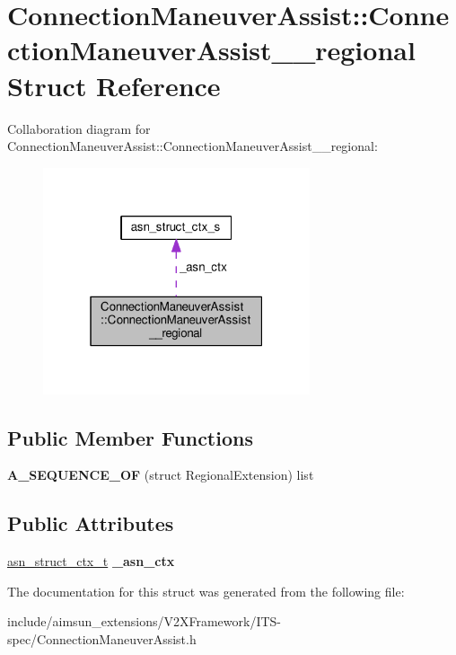 \hypertarget{structConnectionManeuverAssist_1_1ConnectionManeuverAssist____regional}{}\section{Connection\+Maneuver\+Assist\+:\+:Connection\+Maneuver\+Assist\+\_\+\+\_\+regional Struct Reference}
\label{structConnectionManeuverAssist_1_1ConnectionManeuverAssist____regional}


Collaboration diagram for Connection\+Maneuver\+Assist\+:\+:Connection\+Maneuver\+Assist\+\_\+\+\_\+regional\+:\nopagebreak
\begin{figure}[H]
\begin{center}
\leavevmode
\includegraphics[width=223pt]{structConnectionManeuverAssist_1_1ConnectionManeuverAssist____regional__coll__graph}
\end{center}
\end{figure}
\subsection*{Public Member Functions}
\begin{DoxyCompactItemize}
\item 
{\bfseries A\+\_\+\+S\+E\+Q\+U\+E\+N\+C\+E\+\_\+\+OF} (struct Regional\+Extension) list\hypertarget{structConnectionManeuverAssist_1_1ConnectionManeuverAssist____regional_a3c83dad83b808f55f20fe3b6f4047d75}{}\label{structConnectionManeuverAssist_1_1ConnectionManeuverAssist____regional_a3c83dad83b808f55f20fe3b6f4047d75}

\end{DoxyCompactItemize}
\subsection*{Public Attributes}
\begin{DoxyCompactItemize}
\item 
\hyperlink{structasn__struct__ctx__s}{asn\+\_\+struct\+\_\+ctx\+\_\+t} {\bfseries \+\_\+asn\+\_\+ctx}\hypertarget{structConnectionManeuverAssist_1_1ConnectionManeuverAssist____regional_a43bb2198b1649ce2f63cd8f3ea636335}{}\label{structConnectionManeuverAssist_1_1ConnectionManeuverAssist____regional_a43bb2198b1649ce2f63cd8f3ea636335}

\end{DoxyCompactItemize}


The documentation for this struct was generated from the following file\+:\begin{DoxyCompactItemize}
\item 
include/aimsun\+\_\+extensions/\+V2\+X\+Framework/\+I\+T\+S-\/spec/Connection\+Maneuver\+Assist.\+h\end{DoxyCompactItemize}

